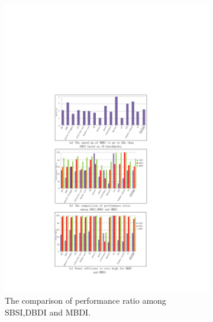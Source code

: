 \documentclass[10pt, conference, compsocconf]{IEEEtran}
\begin{document}
\begin{figure}[t!]
\begin{subfigure}[b]{0.41\textwidth}
		\includegraphics[width=\textwidth]{fi/result_2.pdf}
		\caption{The comparison of performance ratio among SBSI,DBDI and MBDI.}
		\label{fig:b}
	\end{subfigure}
	\begin{subfigure}[b]{0.41\textwidth}
		\centering

\end{subfigure}
\end{figure}
\end{document}
